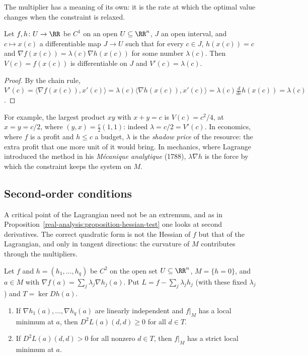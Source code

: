 The multiplier has a meaning of its own: it is the rate at which the optimal value changes when the constraint is relaxed.

\begin{proposition}\label{real-analysis:proposition-multiplier-sensitivity}
Let $f, h \colon U \to \RR$ be $C^1$ on an open $U \subseteq \RR^n$, $J$ an open interval, and $c \mapsto x(c)$ a differentiable map $J \to U$ such that for every $c \in J$, $h(x(c)) = c$ and
$\nabla f(x(c)) = \lambda(c)\nabla h(x(c))$ for some number $\lambda(c)$. Then $V(c) = f(x(c))$ is differentiable on $J$ and $V'(c) = \lambda(c)$.
\end{proposition}

\begin{proof}
By the chain rule, $V'(c) = \langle\nabla f(x(c)), x'(c)\rangle = \lambda(c)\langle\nabla h(x(c)), x'(c)\rangle = \lambda(c)\frac{d}{dc}h(x(c)) = \lambda(c)$.
\end{proof}

For example, the largest product $xy$ with $x + y = c$ is $V(c) = c^2/4$, at $x = y = c/2$, where $(y, x) = \frac c2(1, 1)$: indeed $\lambda = c/2 = V'(c)$. In economics, where $f$ is a profit and $h \leq c$ a
budget, $\lambda$ is the \emph{shadow price} of the resource: the extra profit that one more unit of it would bring. In mechanics, where Lagrange introduced the method in his \emph{M\'ecanique
analytique} (1788), $\lambda\nabla h$ is the force by which the constraint keeps the system on $M$.

\subsection{Second-order conditions}\label{real-analysis:subsection-second-order}

A critical point of the Lagrangian need not be an extremum, and as in Proposition~\ref{real-analysis:proposition-hessian-test} one looks at second derivatives. The correct quadratic form is
not the Hessian of $f$ but that of the Lagrangian, and only in tangent directions: the curvature of $M$ contributes through the multipliers.

\begin{theorem}\label{real-analysis:theorem-lagrange-second-order}
Let $f$ and $h = (h_1, \ldots, h_q)$ be $C^2$ on the open set $U \subseteq \RR^n$, $M = \{h = 0\}$, and $a \in M$ with $\nabla f(a) = \sum_j\lambda_j\nabla h_j(a)$. Put
$L = f - \sum_j\lambda_jh_j$ (with these fixed $\lambda_j$) and $T = \ker Dh(a)$.
\begin{enumerate}
\item If $\nabla h_1(a), \ldots, \nabla h_q(a)$ are linearly independent and $f|_M$ has a local minimum at $a$, then $D^2L(a)(d, d) \geq 0$ for all $d \in T$.
\item If $D^2L(a)(d, d) > 0$ for all nonzero $d \in T$, then $f|_M$ has a strict local minimum at $a$.
\end{enumerate}
\end{theorem}

